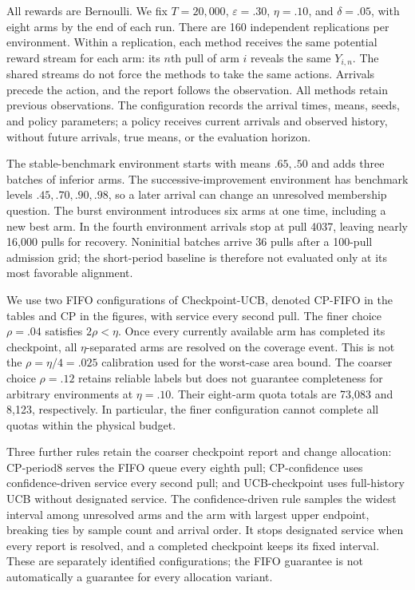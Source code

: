 \documentclass[11pt]{article}
\theoremstyle{remark}
\begin{document}
All rewards are Bernoulli. We fix $T=20{,}000$, $\varepsilon=.30$,
$\eta=.10$, and $\delta=.05$, with eight arms by the end of each run.
There are 160 independent replications per environment. Within a replication,
each method receives the same potential reward stream for each arm: its
$n$th pull of arm $i$ reveals the same $Y_{i,n}$. The shared streams do not
force the methods to take the same actions. Arrivals precede the action,
and the report follows the observation. All methods retain previous
observations. The configuration records the arrival times, means, seeds,
and policy parameters; a policy receives current arrivals and observed
history, without future arrivals, true means, or the evaluation horizon.

The stable-benchmark environment starts with means $.65,.50$ and adds three
batches of inferior arms. The successive-improvement environment has
benchmark levels $.45,.70,.90,.98$, so a later arrival can change an
unresolved membership question. The burst environment introduces six arms
at one time, including a new best arm. In the fourth environment arrivals
stop at pull 4037, leaving nearly 16,000 pulls for recovery. Noninitial
batches arrive 36 pulls after a 100-pull admission grid; the short-period
baseline is therefore not evaluated only at its most favorable alignment.

We use two FIFO configurations of Checkpoint-UCB, denoted CP-FIFO in the
tables and CP in the figures, with service every second pull. The finer
choice $\rho=.04$ satisfies $2\rho<\eta$. Once every currently available
arm has completed its checkpoint, all $\eta$-separated arms are resolved
on the coverage event. This is not the
$\rho=\eta/4=.025$ calibration used for the worst-case area bound.
The coarser choice $\rho=.12$ retains reliable labels but does not guarantee
completeness for arbitrary environments at $\eta=.10$. Their eight-arm
quota totals are 73,083 and 8,123, respectively. In particular, the finer
configuration cannot complete all quotas within the physical budget.

Three further rules retain the coarser checkpoint report and change
allocation: CP-period8 serves the FIFO queue every eighth pull;
CP-confidence uses confidence-driven service every second pull; and
UCB-checkpoint uses full-history UCB without designated service. The
confidence-driven rule samples the widest interval among unresolved arms
and the arm with largest upper endpoint, breaking ties by sample count and
arrival order. It stops designated service when every report is resolved,
and a completed checkpoint keeps its fixed interval. These are separately
identified configurations; the FIFO guarantee is not automatically a
guarantee for every allocation variant.
\end{document}
